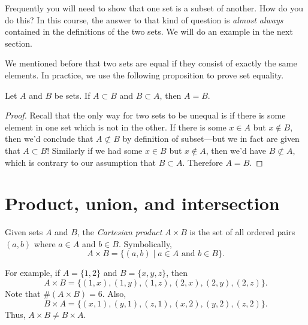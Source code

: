 \documentclass{tufte-book}
\begin{document}
Frequently you will need to show that one set is a subset of another. How do you do this? In this course, the answer to that kind of question is \emph{almost always} contained in the definitions of the two sets. We will do an example in the next section.

We mentioned before that two sets are equal if they consist of exactly the same elements. In practice, we use the following proposition to prove set equality.
\begin{proposition}
  Let $A$ and $B$ be sets. If $A \subset B$ and $B \subset A$, then $A = B$. 
\end{proposition}

\begin{proof}
  Recall that the only way for two sets to be unequal is if there is some element in one set which is not in the other. If there is some $x \in A$ but $x \notin B$, then we'd conclude that $A \not\subset B$ by definition of subset---but we in fact are given that $A \subset B$! Similarly if we had some $x \in B$ but $x \notin A$, then we'd have $B \not\subset A$, which is contrary to our assumption that $B \subset A$. Therefore $A = B$.
\end{proof}



\section{Product, union, and intersection}
\label{sec:prod-union-inters}

\begin{definition}
  Given sets $A$ and $B$, the \emph{Cartesian product}  $A \times B$ is the set of all ordered pairs $(a, b)$ where $a \in A$ and $b \in B$. Symbolically,
  \[
  A \times B = \{(a,b) \mid a \in A \text{ and } b \in B\}.
  \]
\end{definition}
For example, if $A = \{1, 2\}$ and $B = \{x, y, z\}$, then
\[
A \times B = \{(1, x), (1, y), (1, z), (2, x), (2, y), (2, z)\}.
\]
Note that $\#(A \times B) = 6$. Also,
\[
B \times A = \{(x, 1), (y, 1), (z, 1), (x, 2), (y, 2), (z, 2)\}.
\]
Thus, $A \times B \neq B \times A$.
\end{document}
